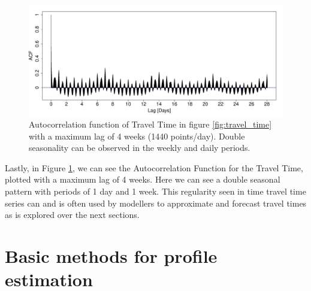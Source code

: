 \documentclass[a4paper, 10pt, conference]{ieeeconf}      %
\begin{document}
\begin{figure}[htbp]
	\centerline{\includegraphics[width=\linewidth]{./images/ACF_M6_Link3.pdf}}
	\caption{Autocorrelation function of Travel Time in figure \ref{fig:travel_time} with a maximum lag of 4 weeks (1440 points/day). Double seasonality can be observed in the weekly and daily periods.}
	\label{fig:ACF}
\end{figure}
Lastly, in Figure \ref{fig:ACF}, we can see the Autocorrelation Function for the Travel Time, plotted with a maximum lag of 4 weeks. Here we can see a double seasonal pattern with periods of 1 day and 1 week.
This regularity seen in time travel time series can and is often used by modellers to approximate and forecast travel times as is explored over the next sections.

\section{Basic methods for profile estimation}\label{Basic methods for profile estimation}
\end{document}
